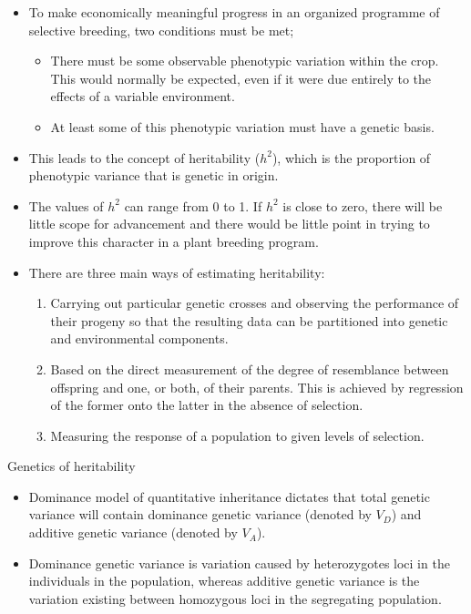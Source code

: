 \documentclass[11pt,dvipsnames,ignorenonframetext,aspectratio=169]{beamer}
\providecommand{\tightlist}{%
  \setlength{\itemsep}{0pt}\setlength{\parskip}{0pt}}
\begin{document}
\begin{itemize}
\tightlist
\item
  To make economically meaningful progress in an organized programme of
  selective breeding, two conditions must be met;

  \begin{itemize}
  \tightlist
  \item
    There must be some observable phenotypic variation within the crop.
    This would normally be expected, even if it were due entirely to the
    effects of a variable environment.
  \item
    At least some of this phenotypic variation must have a genetic
    basis.
  \end{itemize}
\item
  This leads to the concept of heritability (\(h^2\)), which is the
  proportion of phenotypic variance that is genetic in origin.
\item
  The values of \(h^2\) can range from 0 to 1. If \(h^2\) is close to
  zero, there will be little scope for advancement and there would be
  little point in trying to improve this character in a plant breeding
  program.
\item
  There are three main ways of estimating heritability:

  \begin{enumerate}
  \tightlist
  \item
    Carrying out particular genetic crosses and observing the
    performance of their progeny so that the resulting data can be
    partitioned into genetic and environmental components.
  \item
    Based on the direct measurement of the degree of resemblance between
    offspring and one, or both, of their parents. This is achieved by
    regression of the former onto the latter in the absence of
    selection.
  \item
    Measuring the response of a population to given levels of selection.
  \end{enumerate}
\end{itemize}

\begin{frame}{Genetics of heritability}
\protect\hypertarget{genetics-of-heritability}{}

\begin{itemize}
\tightlist
\item
  Dominance model of quantitative inheritance dictates that total
  genetic variance will contain dominance genetic variance (denoted by
  \(V_D\)) and additive genetic variance (denoted by \(V_A\)).
\item
  Dominance genetic variance is variation caused by heterozygotes loci
  in the individuals in the population, whereas additive genetic
  variance is the variation existing between homozygous loci in the
  segregating population.
\end{itemize}

\end{frame}
\end{document}
